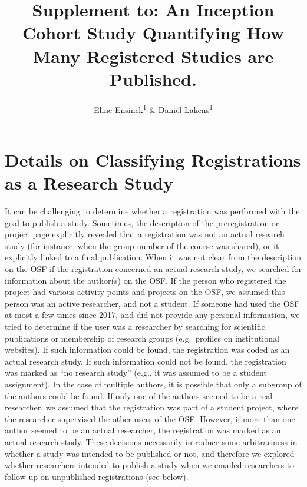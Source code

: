 \documentclass[
  ,jou, a4paper,floatsintext]{apa6}
\title{Supplement to: An Inception Cohort Study Quantifying How Many Registered Studies are Published.}
\author{Eline Ensinck\textsuperscript{1} \& Daniël Lakens\textsuperscript{1}}
\date{}
\affiliation{\vspace{0.5cm}\textsuperscript{1} Eindhoven University of Technology}
\begin{document}
\maketitle

\hypertarget{details-on-classifying-registrations-as-a-research-study}{%
\section{Details on Classifying Registrations as a Research Study}\label{details-on-classifying-registrations-as-a-research-study}}

It can be challenging to determine whether a registration was performed with the goal to publish a study. Sometimes, the description of the preregistration or project page explicitly revealed that a registration was not an actual research study (for instance, when the group number of the course was shared), or it explicitly linked to a final publication. When it was not clear from the description on the OSF if the registration concerned an actual research study, we searched for information about the author(s) on the OSF. If the person who registered the project had various activity points and projects on the OSF, we assumed this person was an active researcher, and not a student. If someone had used the OSF at most a few times since 2017, and did not provide any personal information, we tried to determine if the user was a researcher by searching for scientific publications or membership of research groups (e.g.~profiles on institutional websites). If such information could be found, the registration was coded as an actual research study. If such information could not be found, the registration was marked as ``no research study'' (e.g., it was assumed to be a student assignment). In the case of multiple authors, it is possible that only a subgroup of the authors could be found. If only one of the authors seemed to be a real researcher, we assumed that the registration was part of a student project, where the researcher supervised the other users of the OSF. However, if more than one author seemed to be an actual researcher, the registration was marked as an actual research study. These decisions necessarily introduce some arbitrariness in whether a study was intended to be published or not, and therefore we explored whether researchers intended to publish a study when we emailed researchers to follow up on unpublished registrations (see below).
\end{document}
